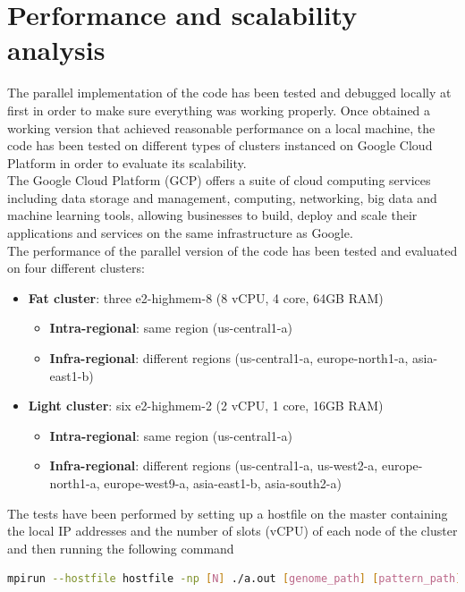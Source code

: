 \documentclass[final,5p,times,twocolumn,authoryear]{elsarticle}
\begin{document}
\section{Performance and scalability analysis}
The parallel implementation of the code has been tested and debugged locally at first in order to make sure everything was working properly. Once obtained a working version that achieved reasonable performance on a local machine, the code has been tested on different types of clusters instanced on Google Cloud Platform in order to evaluate its scalability. \\
The Google Cloud Platform (GCP) offers a suite of cloud computing services including data storage and management, computing, networking, big data and machine learning tools, allowing businesses to build, deploy and scale their applications and services on the same infrastructure as Google. \\
The performance of the parallel version of the code has been tested and evaluated on four different clusters:
\begin{itemize}
    \item \textbf{Fat cluster}: three e2-highmem-8 (8 vCPU, 4 core, 64GB RAM)
    \begin{itemize}
        \item \textbf{Intra-regional}: same region (us-central1-a)
        \item \textbf{Infra-regional}: different regions (us-central1-a, europe-north1-a, asia-east1-b)
    \end{itemize}
    \item \textbf{Light cluster}: six e2-highmem-2 (2 vCPU, 1 core, 16GB RAM)
    \begin{itemize}
        \item \textbf{Intra-regional}: same region (us-central1-a)
        \item \textbf{Infra-regional}: different regions (us-central1-a, us-west2-a, europe-north1-a, europe-west9-a, asia-east1-b, asia-south2-a)
    \end{itemize}
\end{itemize}
The tests have been performed by setting up a hostfile on the master containing the local IP addresses and the number of slots (vCPU) of each node of the cluster and then running the following command \\
\begin{lstlisting}[language=bash]
mpirun --hostfile hostfile -np [N] ./a.out [genome_path] [pattern_path]
\end{lstlisting}
\end{document}
